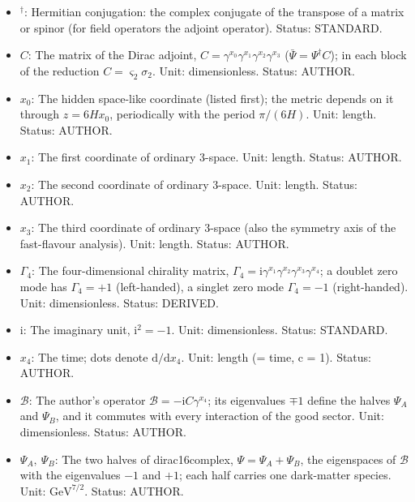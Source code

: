 \documentclass[
  10pt,
]{article}
\begin{document}
\begin{itemize}
  \(\mathrm{GeV}^{7/2}\). Status: RECORD.
\item
  \({}^\dagger\): Hermitian conjugation: the complex conjugate of the
  transpose of a matrix or spinor (for field operators the adjoint
  operator). Status: STANDARD.
\item
  \(C\): The matrix of the Dirac adjoint,
  \(C = \gamma^{x_0}\gamma^{x_1}\gamma^{x_2}\gamma^{x_3}\)
  (\(\bar\Psi = \Psi^\dagger C\)); in each block of the reduction
  \(C = \varsigma_2\sigma_2\). Unit: dimensionless. Status: AUTHOR.
\item
  \(x_0\): The hidden space-like coordinate (listed first); the metric
  depends on it through \(z = 6Hx_0\), periodically with the period
  \(\pi/(6H)\). Unit: length. Status: AUTHOR.
\item
  \(x_1\): The first coordinate of ordinary 3-space. Unit: length.
  Status: AUTHOR.
\item
  \(x_2\): The second coordinate of ordinary 3-space. Unit: length.
  Status: AUTHOR.
\item
  \(x_3\): The third coordinate of ordinary 3-space (also the symmetry
  axis of the fast-flavour analysis). Unit: length. Status: AUTHOR.
\item
  \(\Gamma_4\): The four-dimensional chirality matrix,
  \(\Gamma_4 = \mathrm{i}\gamma^{x_1}\gamma^{x_2}\gamma^{x_3}\gamma^{x_4}\);
  a doublet zero mode has \(\Gamma_4 = +1\) (left-handed), a singlet
  zero mode \(\Gamma_4 = -1\) (right-handed). Unit: dimensionless.
  Status: DERIVED.
\item
  \(\mathrm{i}\): The imaginary unit, \(\mathrm{i}^2 = -1\). Unit:
  dimensionless. Status: STANDARD.
\item
  \(x_4\): The time; dots denote \(\mathrm{d}/\mathrm{d}x_4\). Unit:
  length (= time, c = 1). Status: AUTHOR.
\item
  \(\mathcal{B}\): The author's operator
  \(\mathcal{B} = -\mathrm{i}C\gamma^{x_4}\); its eigenvalues \(\mp1\)
  define the halves \(\Psi_A\) and \(\Psi_B\), and it commutes with
  every interaction of the good sector. Unit: dimensionless. Status:
  AUTHOR.
\item
  \(\Psi_A,\ \Psi_B\): The two halves of dirac16complex,
  \(\Psi = \Psi_A + \Psi_B\), the eigenspaces of \(\mathcal{B}\) with
  the eigenvalues \(-1\) and \(+1\); each half carries one dark-matter
  species. Unit: \(\mathrm{GeV}^{7/2}\). Status: AUTHOR.
\end{itemize}
\end{document}
